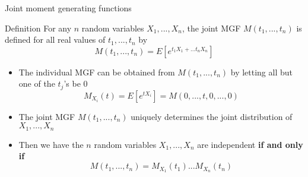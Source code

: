 \documentclass[slidestop,compress,mathserif]{beamer}
\begin{document}
\begin{frame}{Joint moment generating functions}
\begin{block}{Definition}
For any $n$ random variables $X_1, ..., X_n$, the joint MGF $M(t_1, ..., t_n)$ is defined for all real values of $t_1, ..., t_n$ by
$$M(t_1, ..., t_n) = E[e^{t_1X_1+...t_nX_n}]$$
\end{block}%
\pause
{\small{
\begin{itemize}
\item The individual MGF can be obtained from $M(t_1, ..., t_n)$ by letting all but one of the $t_j$'s be 0
$$M_{X_i}(t) = E[e^{tX_i}] = M(0, ..., t, 0, ..., 0)$$
\pause
\item The joint MGF $M(t_1, ..., t_n)$ uniquely determines the joint distribution of $X_1, ..., X_n$
\pause
\item Then we have the $n$ random variables $X_1, ..., X_n$ are independent {\bf{if and only if}}
$$M(t_1, ..., t_n) = M_{X_1}(t_1)...M_{X_n}(t_n)$$
\end{itemize}
}}
\end{frame}
%
%
\end{document}
